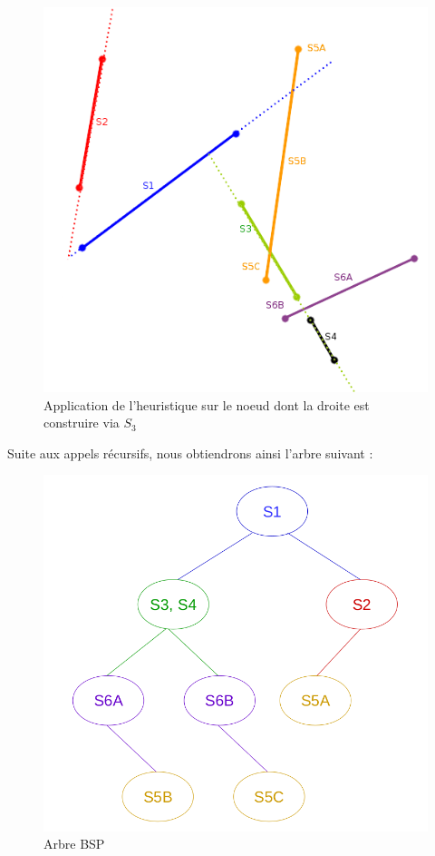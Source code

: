 \documentclass[11pt,a4paper]{article}
\theoremstyle{definition}
\theoremstyle{remark}
\begin{document}
\begin{figure}[H]
\centering
\includegraphics[scale=0.6]{bsp_ex_5.png}
\caption{Application de l'heuristique sur le noeud dont la droite est construire via $S_3$}
\label{bsp_ex_5}
\end{figure}

Suite aux appels récursifs, nous obtiendrons ainsi l'arbre suivant :

\begin{figure}[H]
\centering
\includegraphics[scale=0.35]{bsp_ex_3.png}
\caption{Arbre BSP}
\label{bsp_tree}
\end{figure}
\end{document}
